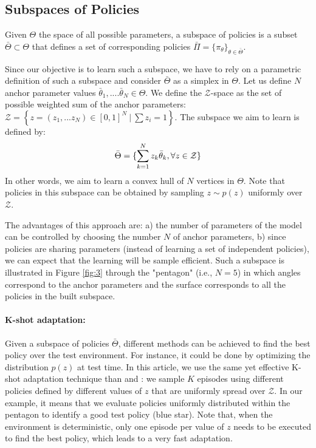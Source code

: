 \subsection{Subspaces of Policies}
\label{sec:subspaces}
\vspace{-0.3cm}
Given $\Theta$ the space of all possible parameters, a subspace of policies is a subset $\bar{\Theta} \subset \Theta$ that defines a set of corresponding policies $\bar{\Pi} = \{\pi_\theta\}_{\theta \in \bar{\Theta}}$.

Since our objective is to learn such a subspace, we have to rely on a parametric definition of such a subspace and consider $\bar{\Theta}$ as a simplex in ${\Theta}$. Let us define $N$ anchor parameter values $\bar{\theta}_1,....\bar{\theta}_N \in \Theta$. We define the $\mathcal{Z}$-space as the set of possible weighted sum of the anchor parameters: $\mathcal{Z}=\left \{z=(z_1,...z_N)\in[0,1]^N \:| \: \sum z_i=1\right \}$. The subspace we aim to learn is defined by:
\begin{equation}
    \bar{\Theta}=\{ \sum\limits_{k=1}^N z_k \bar{\theta}_k, \forall z \in \mathcal{Z} \} \vspace{-0.1cm} 
    \label{convexHull}
\end{equation}
In other words, we aim to learn a convex hull of $N$ vertices in $\Theta$. Note that policies in this subspace can be obtained by sampling $z \sim p(z)$ uniformly over $\mathcal{Z}$.

The advantages of this approach are: a) the number of parameters of the model can be controlled by choosing the number $N$ of anchor parameters, b) since policies are sharing parameters (instead of learning a set of independent policies), we can expect that the learning will be sample efficient.
Such a subspace is illustrated in Figure \ref{fig:3} through the "pentagon" (i.e., $N=5$) in which angles correspond to the anchor parameters and the surface corresponds to all the policies in the built subspace.


\paragraph{K-shot adaptation:} 
\label{sec:adaptation}

Given a subspace of policies $\bar{\Theta}$, different methods can be achieved to find the best policy over the test environment. For instance, it could be done by optimizing the distribution $p(z)$ at test time. In this article, we use the same yet effective K-shot adaptation technique than \cite{SMERL} and \cite{Tokyo}: we sample $K$ episodes using different policies defined by different values of $z$ that are uniformly spread over $\mathcal{Z}$. In our example, it means that we evaluate policies uniformly distributed within the pentagon to identify a good test policy (blue star). Note that, when the environment is deterministic, only one episode per value of $z$ needs to be executed to find the best policy, which leads to a very fast adaptation.

